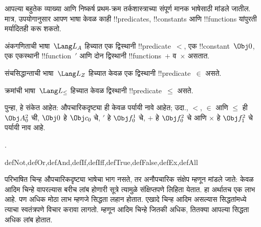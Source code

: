 \documentclass[../../../include/open-logic-section]{subfiles}
\begin{document}
आपल्या बहुतेक व्याख्या आणि निष्कर्ष प्रथम-क्रम तर्कशास्त्राच्या संपूर्ण
मानक भाषेसाठी मांडले जातील. मात्र, उपयोगानुसार आपण भाषा केवळ काही
!!{predicate}s, !!{constant}s आणि !!{function}s यांपुरती मर्यादितही करू शकतो.

\begin{ex}
अंकगणिताची भाषा~$\Lang L_A$ हिच्यात एक द्विस्थानी !!{predicate}~$<$,
एक !!{constant}~$\Obj 0$, एक एकस्थानी !!{function}~$\prime$ आणि दोन
द्विस्थानी !!{function}s~$+$ व~$\times$ असतात.
\end{ex}

\begin{ex}
संचसिद्धान्ताची भाषा~$\Lang L_Z$ हिच्यात केवळ एक द्विस्थानी
!!{predicate}~$\in$ असते.
\end{ex}

\begin{ex}
क्रमांची भाषा~$\Lang L_\le$ हिच्यात केवळ द्विस्थानी
!!{predicate}~$\le$ असते.
\end{ex}

पुन्हा, हे संकेत आहेत: औपचारिकदृष्ट्या ही केवळ पर्यायी नावे आहेत;
उदा., $<$, $\in$ आणि $\le$ ही $\Obj A^2_0$ ची, $\Obj 0$ हे
$\Obj c_0$ चे, $\prime$ हे $\Obj f^1_0$ चे, $+$ हे $\Obj f^2_0$ चे आणि $\times$ हे
$\Obj f^2_1$ चे पर्यायी नाव आहे.

.

\begin{tagblock}{defNot,defOr,defAnd,defIf,defIff,defTrue,defFalse,defEx,defAll}
\begin{explain}
परिभाषित चिन्ह औपचारिकदृष्ट्या भाषेचा भाग नसते, तर अनौपचारिक संक्षेप
म्हणून मांडले जाते: केवळ आदिम चिन्हे वापरल्यास बरीच लांब होणारी सूत्रे
त्यामुळे संक्षिप्तपणे लिहिता येतात. हा अर्थातच एक लाभ आहे. पण अधिक मोठा
लाभ म्हणजे सिद्धता लहान होतात. एखादे चिन्ह आदिम असल्यास सिद्धतांमध्ये
त्याचा स्वतंत्रपणे विचार करावा लागतो. म्हणून आदिम चिन्हे जितकी अधिक,
तितक्या आपल्या सिद्धता अधिक लांब होतात.
\end{explain}
\end{tagblock}
\end{document}
